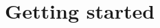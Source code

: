 \documentclass[a4paper,12pt,titlepage]{article}
\begin{document}
%
%

\newpage

\setcounter{page}{1}

\section{Getting started}
\end{document}
